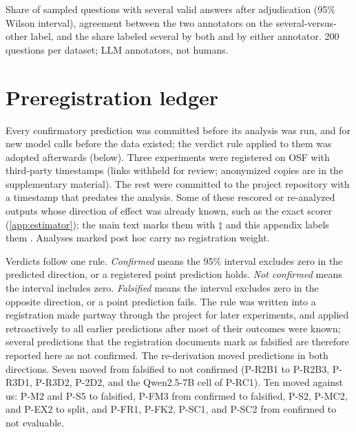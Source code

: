 \begin{table}[htbp]
\centering
\caption{Share of sampled questions with several valid answers after adjudication (95\% Wilson interval), agreement between the two annotators on the several-versus-other label, and the share labeled several by both and by either annotator. 200 questions per dataset; LLM annotators, not humans.\pre}
\label{tab:prevalence-v2}
\footnotesize
\begin{adjustbox}{max width=\linewidth}\end{adjustbox}
\end{table}

\FloatBarrier
\section{Preregistration ledger}
\label{app:ledger}

Every confirmatory prediction was committed before its analysis was run, and for new model calls before the data existed; the verdict rule applied to them was adopted afterwards (below). Three experiments were registered on OSF with third-party timestamps\osf{} (links withheld for review; anonymized copies are in the supplementary material). The rest were committed to the project repository with a timestamp that predates the analysis\pre. Some of these rescored or re-analyzed outputs whose direction of effect was already known, such as the exact scorer (\cref{app:estimator}); the main text marks them with $\ddagger$ and this appendix labels them \pre. Analyses marked post hoc\ph{} carry no registration weight.

Verdicts follow one rule. \emph{Confirmed} means the 95\% interval excludes zero in the predicted direction, or a registered point prediction holds. \emph{Not confirmed} means the interval includes zero. \emph{Falsified} means the interval excludes zero in the opposite direction, or a point prediction fails. The rule was written into a registration made partway through the project for later experiments, and applied retroactively to all earlier predictions after most of their outcomes were known; several predictions that the registration documents mark as falsified are therefore reported here as not confirmed. The re-derivation moved predictions in both directions. Seven moved from falsified to not confirmed (P-R2B1 to P-R2B3, P-R3D1, P-R3D2, P-2D2, and the Qwen2.5-7B cell of P-RC1). Ten moved against us: P-M2 and P-S5 to falsified, P-FM3 from confirmed to falsified, P-S2, P-MC2, and P-EX2 to split, and P-FR1, P-FK2, P-SC1, and P-SC2 from confirmed to not evaluable.

